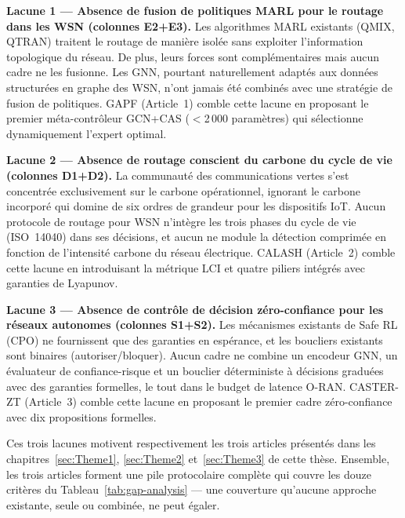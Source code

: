 \textbf{Lacune 1 --- Absence de fusion de politiques MARL pour le routage dans les WSN (colonnes E2+E3).} Les algorithmes MARL existants (QMIX, QTRAN) traitent le routage de manière isolée sans exploiter l'information topologique du réseau. De plus, leurs forces sont complémentaires mais aucun cadre ne les fusionne. Les GNN, pourtant naturellement adaptés aux données structurées en graphe des WSN, n'ont jamais été combinés avec une stratégie de fusion de politiques. GAPF (Article~1) comble cette lacune en proposant le premier méta-contrôleur GCN+CAS ($<$2\,000 paramètres) qui sélectionne dynamiquement l'expert optimal.

\textbf{Lacune 2 --- Absence de routage conscient du carbone du cycle de vie (colonnes D1+D2).} La communauté des communications vertes s'est concentrée exclusivement sur le carbone opérationnel, ignorant le carbone incorporé qui domine de six ordres de grandeur pour les dispositifs IoT. Aucun protocole de routage pour WSN n'intègre les trois phases du cycle de vie (ISO~14040) dans ses décisions, et aucun ne module la détection comprimée en fonction de l'intensité carbone du réseau électrique. CALASH (Article~2) comble cette lacune en introduisant la métrique LCI et quatre piliers intégrés avec garanties de Lyapunov.

\textbf{Lacune 3 --- Absence de contrôle de décision zéro-confiance pour les réseaux autonomes (colonnes S1+S2).} Les mécanismes existants de Safe RL (CPO) ne fournissent que des garanties en espérance, et les boucliers existants sont binaires (autoriser/bloquer). Aucun cadre ne combine un encodeur GNN, un évaluateur de confiance-risque et un bouclier déterministe à décisions graduées avec des garanties formelles, le tout dans le budget de latence O-RAN. CASTER-ZT (Article~3) comble cette lacune en proposant le premier cadre zéro-confiance avec dix propositions formelles.

\medskip
Ces trois lacunes motivent respectivement les trois articles présentés dans les chapitres~\ref{sec:Theme1}, \ref{sec:Theme2} et~\ref{sec:Theme3} de cette thèse. Ensemble, les trois articles forment une pile protocolaire complète qui couvre les douze critères du Tableau~\ref{tab:gap-analysis} --- une couverture qu'aucune approche existante, seule ou combinée, ne peut égaler.